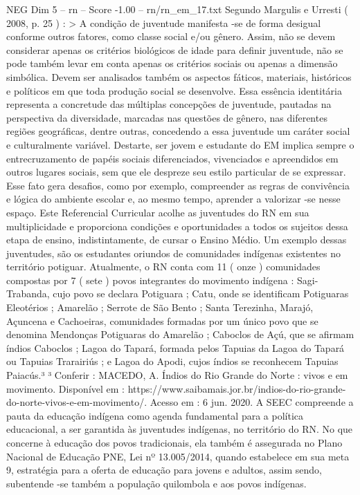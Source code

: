 \begin{textsample}{NEG Dim 5 – rn – Score -1.00 – rn/rn\_em\_17.txt}
Segundo Margulis e Urresti ( 2008, p. 25 ) : > A condição de juventude manifesta -se de forma desigual conforme outros fatores, como classe social e/ou gênero.
Assim, não se devem considerar apenas os critérios biológicos de idade para definir juventude, não se pode também levar em conta apenas os critérios sociais ou apenas a dimensão simbólica.
Devem ser analisados também os aspectos fáticos, materiais, históricos e políticos em que toda produção social se desenvolve.
Essa essência identitária representa a concretude das múltiplas concepções de juventude, pautadas na perspectiva da diversidade, marcadas nas questões de gênero, nas diferentes regiões geográficas, dentre outras, concedendo a essa juventude um caráter social e culturalmente variável.
Destarte, ser jovem e estudante do EM implica sempre o entrecruzamento de papéis sociais diferenciados, vivenciados e apreendidos em outros lugares sociais, sem que ele despreze seu estilo particular de se expressar.
Esse fato gera desafios, como por exemplo, compreender as regras de convivência e lógica do ambiente escolar e, ao mesmo tempo, aprender a valorizar -se nesse espaço.
Este Referencial Curricular acolhe as juventudes do RN em sua multiplicidade e proporciona condições e oportunidades a todos os sujeitos dessa etapa de ensino, indistintamente, de cursar o Ensino Médio.
Um exemplo dessas juventudes, são os estudantes oriundos de comunidades indígenas existentes no território potiguar.
Atualmente, o RN conta com 11 ( onze ) comunidades compostas por 7 ( sete ) povos integrantes do movimento indígena : Sagi-Trabanda, cujo povo se declara Potiguara ; Catu, onde se identificam Potiguaras Eleotérios ; Amarelão ; Serrote de São Bento ; Santa Terezinha, Marajó, Açuncena e Cachoeiras, comunidades formadas por um único povo que se denomina Mendonças Potiguaras do Amarelão ; Caboclos de Açú, que se afirmam índios Caboclos ; Lagoa do Tapará, formada pelos Tapuias da Lagoa do Tapará ou Tapuias Trarairiús ; e Lagoa do Apodi, cujos índios se reconhecem Tapuias Paiacús.³ ³ Conferir : MACEDO, A.
Índios do Rio Grande do Norte : vivos e em movimento.
Disponível em : https://www.saibamais.jor.br/indios-do-rio-grande-do-norte-vivos-e-em-movimento/.
Acesso em : 6 jun. 2020.
A SEEC compreende a pauta da educação indígena como agenda fundamental para a política educacional, a ser garantida às juventudes indígenas, no território do RN.
No que concerne à educação dos povos tradicionais, ela também é assegurada no Plano Nacional de Educação PNE, Lei nº 13.005/2014, quando estabelece em sua meta 9, estratégia para a oferta de educação para jovens e adultos, assim sendo, subentende -se também a população quilombola e aos povos indígenas.

\end{textsample}
